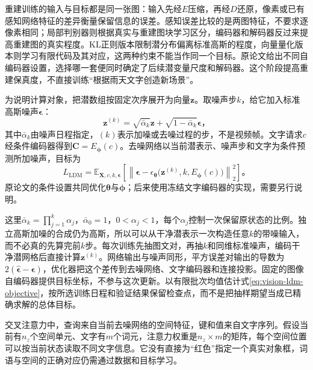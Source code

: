 重建训练的输入与目标都是同一张图：输入先经$E$压缩，再经$D$还原，像素或已有感知网络特征的差异衡量保留信息的误差。感知误差比较的是两图特征，不要求逐像素相同；局部判别器则根据真实与重建图块学习区分，编码器和解码器反过来提高重建图的真实程度。KL正则版本限制潜分布偏离标准高斯的程度，向量量化版本则学习有限代码及其对应，这两种约束不能当作同一个目标。原论文给出不同自编码器设置，选择哪一套便同时确定了后续潜变量尺度和解码器。这个阶段提高重建保真度，不直接训练“根据雨天文字创造新场景”。

为说明计算对象，把潜数组按固定次序展开为向量$\bm z$。取噪声步$k$，给它加入标准高斯噪声$\bm\epsilon$：
\[
  \bm z^{(k)}
  =\sqrt{\bar\alpha_k}\bm z+
    \sqrt{1-\bar\alpha_k}\bm\epsilon\text{，}
\]
其中$\bar\alpha_k$由噪声日程指定，$(k)$表示加噪或去噪过程的步，不是视频帧。文字请求$c$经条件编码器得到$\bm C=E_{\bm\phi}(c)$。去噪网络以当前潜表示、噪声步和文字为条件预测所加噪声，目标为
\begin{equation}
  L_{\mathrm{LDM}}
  =\mathbb E_{\bm X,c,k,\bm\epsilon}
    \left[
      \left\lVert\bm\epsilon-
      \epsilon_{\bm\theta}
      \bigl(\bm z^{(k)},k,E_{\bm\phi}(c)\bigr)
      \right\rVert_2^2
    \right]\text{。}
  \label{eq:vision-ldm-objective}
\end{equation}
原论文的条件设置共同优化$\bm\theta$与$\bm\phi$；后来使用冻结文字编码器的实现，需要另行说明。

这里$\bar\alpha_k=\prod_{j=1}^{k}\alpha_j$，$\bar\alpha_0=1$，$0<\alpha_j<1$，每个$\alpha_j$控制一次保留原状态的比例。独立高斯加噪的合成仍为高斯，所以可以从干净潜表示一次构造任意$k$的带噪输入，而不必真的先算完前$k$步。每次训练先抽图文对，再抽$k$和同维标准噪声，编码干净潜网格后直接计算$\bm z^{(k)}$。网络输出与噪声同形，平方误差对输出的导数为$2(\widehat{\bm\epsilon}-\bm\epsilon)$，优化器把这个差传到去噪网络、文字编码器和连接投影。固定的图像自编码器提供目标坐标，不参与这次更新。以有限批次均值估计式\eqref{eq:vision-ldm-objective}，按所选训练日程和验证结果保留检查点，而不是把抽样期望当成已精确求解的总体目标。

交叉注意力中，查询来自当前去噪网络的空间特征，键和值来自文字序列。假设当前有$n_z$个空间单元、文字有$m$个词元，注意力权重是$n_z\times m$的矩阵，每个空间位置可以按当前状态读取不同文字信息。它没有直接为“红色”指定一个真实对象框，词语与空间的正确对应仍需通过数据和目标学习。

